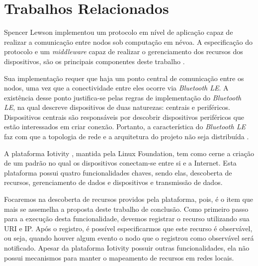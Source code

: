 \section{Trabalhos Relacionados}

Spencer Lewson implementou um protocolo em nível de aplicação \cite{tanenbaum2011redes} capaz de realizar a comunicação entre nodos sob computação em névoa.
A especificação do protocolo e um \textit{middleware} capaz de realizar o gerenciamento dos recursos dos dispositivos, são os principais componentes deste trabalho \cite{Spencer:2015}.

Sua implementação requer que haja um ponto central de comunicação entre os nodos, uma vez que a conectividade entre eles ocorre via \textit{Bluetooth LE}.
A existência desse ponto justifica-se pelas regras de implementação do \textit{Bluetooth LE}, na qual descreve dispositivos de duas naturezas: centrais e periféricos.
Dispositivos centrais são responsáveis por descobrir dispositivos periféricos que estão interessados em criar conexão.
Portanto, a característica do \textit{Bluetooth LE} faz com que a topologia de rede e a arquitetura do projeto não seja distribuída \cite{Spencer:2015}.

A plataforma Iotivity \cite{iotivity}, mantida pela Linux Foundation, tem como cerne a criação de um padrão no qual os dispositivos conectam-se entre si e a Internet.
Esta plataforma possui quatro funcionalidades chaves, sendo elas, descoberta de recursos, gerenciamento de dados e dispositivos e transmissão de dados.

Focaremos na descoberta de recursos providos pela plataforma, pois, é o item que mais se assemelha a proposta deste trabalho de conclusão.
Como primeiro passo para a execução desta funcionalidade, devemos registrar o recurso utilizando sua URI e IP.
Após o registro, é possível especificarmos que este recurso é observável, ou seja, quando houver algum evento o nodo que o registrou como observável será notificado.
Apesar da plataforma Iotivity possuir outras funcionalidades, ela não possui mecanismos para manter o mapeamento de recursos em redes locais.

